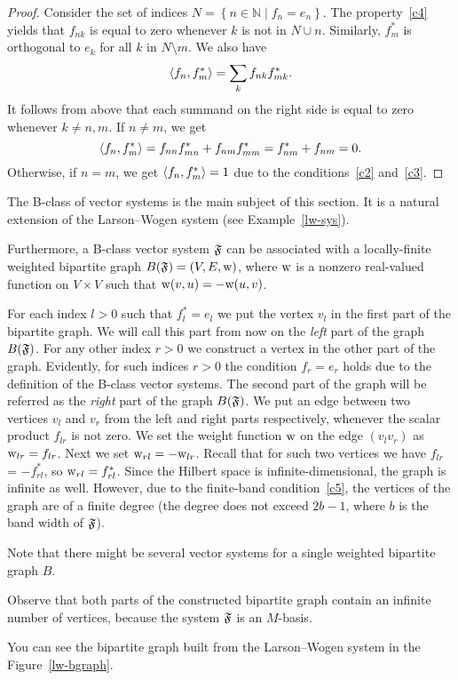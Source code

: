 \documentclass[12pt,oneside,a4paper]{amsart}
\begin{document}
    \begin{proof}
      Consider the set of indices $N = \left\{n \in \mathbb{N} \mid f_n = e_n \right\}$.
      The property~\ref{c4} yields that $f_{nk}$ is equal to zero whenever $k$ is not in $N \cup {n}$.
      Similarly, $f^*_m$ is orthogonal to $e_k$ for all $k$ in $N \setminus {m}$.
      We also have
      \[
        \langle f_n, f^*_m \rangle = \sum_{k} f_{nk} f_{mk}^*.
      \]
      It follows from above that each summand on the right side is equal to zero whenever $k \neq n, m$.
      If $n \neq m$, we get
      \[
        \langle f_n, f^*_m \rangle = f_{nn} f^*_{mn} + f_{nm} f^*_{mm}
        = f^*_{nm} + f_{nm} = 0.
      \]
      Otherwise, if $n = m$, we get $\langle f_n, f^*_m \rangle = 1$ due to the conditions~\ref{c2} and~\ref{c3}.
    \end{proof}
    The B-class of vector systems is the main subject of this section.
    It is a natural extension of the Larson--Wogen system (see Example~\ref{lw-sys}).

    Furthermore, a B-class vector system $\mathfrak{F}$ can be associated with a
      locally-finite weighted bipartite graph $B(\mathfrak{F}) = (V, E, \mathrm{w})$, where $\mathrm{w}$ is a
      nonzero real-valued function on $V\times V$ such that $\mathrm{w}(v, u) = -\mathrm{w}(u, v)$.

    For each index $l > 0$ such that $f^*_l = e_l$ we put the vertex $v_l$ in the first part of the bipartite graph.
    We will call this part from now on the \emph{left} part of the graph $B(\mathfrak{F})$.
    For any other index $r > 0$ we construct a vertex in the other part of the graph.
    Evidently, for such indices $r > 0$ the condition $f_r = e_r$ holds due to the definition of the B-class vector systems.
    The second part of the graph will be referred as the \emph{right} part of the graph $B(\mathfrak{F})$.
    We put an edge between two vertices $v_l$ and $v_r$ from the left and right parts respectively,
      whenever the scalar product $f_{lr}$ is not zero.
    We set the weight function $\mathrm{w}$ on the edge $(v_l v_r)$ as $\mathrm{w}_{lr} = f_{lr}$.
    Next we set $\mathrm{w}_{rl} = -\mathrm{w}_{lr}$.
    Recall that for such two vertices we have $f_{lr}$ = $-f^*_{rl}$, so $\mathrm{w}_{rl} = f^*_{rl}$.
    Since the Hilbert space is infinite-dimensional, the graph is infinite as well.
    However, due to the finite-band condition~\ref{c5}, the vertices of the graph are of a finite degree (the degree does not
      exceed $2b - 1$, where $b$ is the band width of $\mathfrak{F}$).
    \begin{remark}
      Note that there might be several vector systems for a single weighted bipartite graph $B$.
    \end{remark}
    \begin{remark}
      Observe that both parts of the constructed bipartite graph contain an infinite number of vertices, because
        the system $\mathfrak{F}$ is an $M$-basis.
    \end{remark}
    You can see the bipartite graph built from the Larson--Wogen system in the Figure~\ref{lw-bgraph}.
\end{document}
